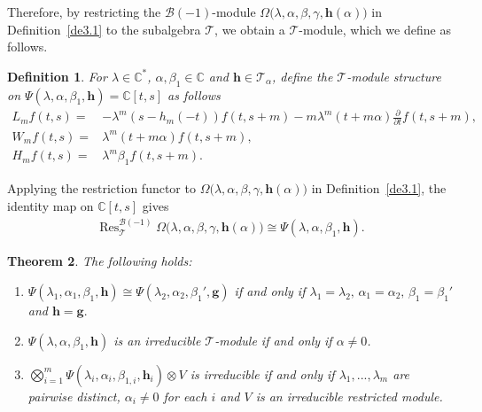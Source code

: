 \documentclass[a4paper]{amsart}
\numberwithin{equation}{section}
\newtheorem{theorem}{Theorem}[section]
\newtheorem{definition}[theorem]{Definition}
\begin{document}
Therefore, by restricting the $\mathcal {B}(-1)$-module
$\Omega\big(\lambda,\alpha,\beta,\gamma,\mathbf h(\alpha)\big)$ in Definition~\ref{de3.1}
to the subalgebra $\mathcal T$, we obtain a $\mathcal T$-module, which we define as follows.
 \begin{definition}\label{def:rank-one-extended-W-module}
     For $\lambda\in \mathbb{C}^{*}$, $\alpha,\beta_{1}\in\mathbb{C}$ and $\mathbf h\in\mathcal T_\alpha$, define  the $\mathcal T$-module structure on $\Psi(\lambda,\alpha,\beta_{1},\mathbf{h})=\mathbb{C}[t,s]$ as follows
     \begin{align*}
         L_{m} f(t,s)=&-\lambda^{m}(s- h_{m}(-t))f(t,s+m)-m\lambda^{m}(t+m \alpha)\frac{\partial}{\partial t}f(t,s+m),\\
     W_{m} f(t,s)=& \lambda^{m}(t+m\alpha)f(t,s+m),\\
     H_{m} f(t,s)=&\lambda^{m}\beta_{1}f(t,s+m).
	     \end{align*}
 \end{definition}
 Applying the restriction functor to
$\Omega\big(\lambda,\alpha,\beta,\gamma,\mathbf h(\alpha)\big)$ in
Definition~\ref{de3.1}, the identity map on $\mathbb C[t,s]$ gives
\begin{align*}
\operatorname{Res}^{\mathcal B(-1)}_{\mathcal T}
\Omega\big(\lambda,\alpha,\beta,\gamma,\mathbf h(\alpha)\big)
\cong
\Psi(\lambda,\alpha,\beta_1,\mathbf h).
\end{align*}
 \begin{theorem}
 The following holds:
 \begin{enumerate}
     \item $\Psi(\lambda_{1},\alpha_{1},\beta_{1},\mathbf{h})\cong\Psi(\lambda_{2},\alpha_{2},\beta_{1}',\mathbf{g})$ if and only if
   $\lambda_{1}=\lambda_{2},\,
    \alpha_{1}=\alpha_{2},\,
    \beta_{1}=\beta_{1}'$ and $
    \mathbf{h}=\mathbf{g}.$
    \item $\Psi(\lambda,\alpha,\beta_{1},\mathbf{h})$ is an irreducible $\mathcal T$-module if and only if $\alpha\neq 0$.
    \item $\bigotimes_{i=1}^{m}\Psi(\lambda_{i},\alpha_{i},\beta_{1,i},\mathbf{h}_{i})\otimes V$ is irreducible if and only if $\lambda_{1},...,\lambda_{m}$ are pairwise distinct, $\alpha_{i}\neq 0$ for each $i$ and $V$ is an irreducible restricted module. 
 \end{enumerate}
 \end{theorem}
\end{document}
